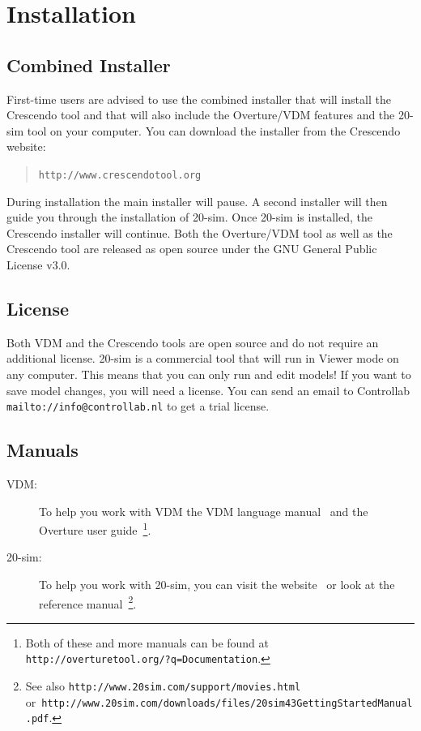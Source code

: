 \documentclass{crescendorepchap}
\newcommand{\url}[1]{\texttt{#1}}
\begin{document}
\section{Installation}\label{sec:install}

\subsection{Combined Installer}

First-time users are advised to use the combined installer that will
install the Crescendo tool and that will also include the Overture/VDM features and the 20-sim tool on your computer. You can
download the installer from the Crescendo website:

\begin{quote}
\url{http://www.crescendotool.org}
\end{quote}

During installation the main installer will pause. A second installer
will then guide you through the installation of 20-sim. Once 20-sim is
installed, the Crescendo installer will continue. Both the Overture/VDM
tool as well as the Crescendo tool are released as open source under the 
GNU General Public License v3.0. 

\subsection{License}

Both VDM and the Crescendo tools are open source and do not require an
additional license. 20-sim is a commercial tool that will run in
Viewer mode on any computer. This means that you
can only run and edit models! If you want to save model changes, you will need
a license. You can send an email to
Controllab \url{mailto://info@controllab.nl} to get a trial license.

\subsection{Manuals}

\begin{description}
\item[VDM:] To help you work with VDM the VDM language manual~\cite{Larsen&13b} and the Overture user guide~\cite{Larsen&13a}\footnote{Both of these and more manuals can be found at
  \url{http://overturetool.org/?q=Documentation}.}.
\item[20-sim:] To help you work with 20-sim, you can visit the
  website~\cite{20sim} or look at the reference
  manual~\cite{Kleijn09}\footnote{See also
    \url{http://www.20sim.com/support/movies.html}
    or~\url{http://www.20sim.com/downloads/files/20sim43GettingStartedManual.pdf}.}.
\end{description}
\end{document}
